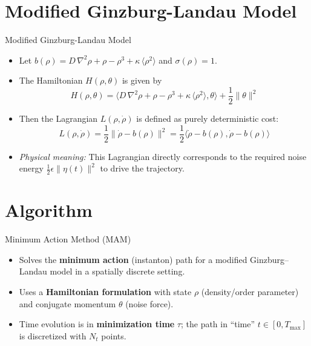 \documentclass{beamer}
\begin{document}
\section{Modified Ginzburg-Landau Model}
\begin{frame}{Modified Ginzburg-Landau Model}
    \begin{itemize}
        \item Let $b(\rho)=D\,\nabla^2\rho + \rho - \rho^3 + \kappa\,\langle \rho^2 \rangle$ and $\sigma(\rho)=1$.
        \item The Hamiltonian $H(\rho, \theta)$ is given by
        \begin{equation}
            H(\rho, \theta) = \langle D\,\nabla^2\rho + \rho - \rho^3 + \kappa\,\langle \rho^2 \rangle, \theta \rangle + \frac{1}{2} \|\theta\|^2
        \end{equation}
        \item Then the Lagrangian $L(\rho, \dot{\rho})$ is defined as purely deterministic cost:
        \begin{equation}
            L(\rho, \dot{\rho}) = \frac{1}{2} \| \dot{\rho} - b(\rho) \|^2 = \frac{1}{2} \langle \dot{\rho} - b(\rho), \dot{\rho} - b(\rho) \rangle
        \end{equation}
        \item \textit{Physical meaning:} This Lagrangian directly corresponds to the required noise energy $\frac{1}{2} \epsilon \|\eta(t)\|^2$ to drive the trajectory.
    \end{itemize}
\end{frame}

\section{Algorithm}
\begin{frame}{Minimum Action Method (MAM)}
    \begin{itemize}
        \item Solves the \textbf{minimum action} (instanton) path for a modified Ginzburg--Landau model in a spatially discrete setting.
        \item Uses a \textbf{Hamiltonian formulation} with state $\rho$ (density/order parameter) and conjugate momentum $\theta$ (noise force).
        \item Time evolution is in \textbf{minimization time} $\tau$; the path in ``time'' $t \in [0, T_{\max}]$ is discretized with $N_t$ points.
    \end{itemize}
\end{frame}
\end{document}
